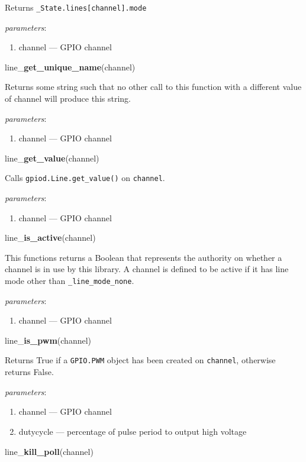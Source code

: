 \documentclass[12pt]{article}
\begin{document}
Returns \texttt{\_State.lines[channel].mode}

\textit{parameters}:
\begin{enumerate}      
        \item channel --- GPIO channel
\end{enumerate}

\noindent line\_\textbf{get\_unique\_name}(channel)

Returns some string such that no other call to this function with a different value of channel will produce this string.

\textit{parameters}:
\begin{enumerate}      
        \item channel --- GPIO channel
\end{enumerate}

\noindent line\_\textbf{get\_value}(channel)

Calls \texttt{gpiod.Line.get\_value()} on \texttt{channel}.

\textit{parameters}:
\begin{enumerate}      
        \item channel --- GPIO channel
\end{enumerate}


\noindent line\_\textbf{is\_active}(channel)

This functions returns a Boolean that represents the authority on whether a channel is in use by this library. A channel is defined to be active if it has line mode other than \texttt{\_line\_mode\_none}.

\textit{parameters}:
\begin{enumerate}      
        \item channel --- GPIO channel
\end{enumerate}

\noindent line\_\textbf{is\_pwm}(channel)

Returns True if a \texttt{GPIO.PWM} object has been created on \texttt{channel}, otherwise returns False.

\textit{parameters}:
\begin{enumerate}      
        \item channel --- GPIO channel
        \item dutycycle --- percentage of pulse period to output high voltage
\end{enumerate}

\noindent line\_\textbf{kill\_poll}(channel)
\end{document}
